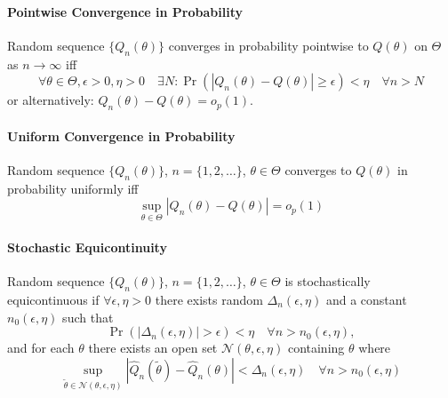 \documentclass[a4paper]{article}
\numberwithin{equation}{subsection}
\begin{document}
\paragraph{Pointwise Convergence in Probability}

Random sequence $\{Q_{n}(\theta)\}$ converges in probability pointwise
to $Q(\theta)$ on $\Theta$ as $n\to\infty$
iff
\begin{equation}
  \label{eq:convergence_in_probability}
  \forall \theta\in\Theta, \epsilon>0, \eta > 0
  \quad
  \exists N:
  \Pr( | Q_{n}(\theta) - Q(\theta)| \ge \epsilon) < \eta
  \quad \forall n > N
\end{equation}
or alternatively: $Q_{n}(\theta) - Q(\theta) = o_{p}(1)$. 


\paragraph{Uniform Convergence in Probability}

Random sequence $\{Q_{n}(\theta)\}$, $n = \{1,2,\dots\}$, $\theta\in\Theta$ converges to
$Q(\theta)$ in probability uniformly iff
\begin{equation}
  \label{eq:uniform_convergence_in_probability}
  \sup_{\theta\in\Theta}
  \left| Q_{n}(\theta) - Q(\theta) \right| = o_{p}(1)
\end{equation}

\paragraph{Stochastic Equicontinuity}

Random sequence $\{Q_{n}(\theta)\}$, $n = \{1,2,\dots\}$,
$\theta\in\Theta$ is stochastically equicontinuous if $\forall
\epsilon, \eta > 0$ there exists random $\Delta_{n}(\epsilon, \eta)$
and a constant $n_{0}(\epsilon,\eta)$ such that 
\begin{equation}
  \Pr(|\Delta_{n}(\epsilon,\eta)| > \epsilon) < \eta
  \quad \forall n > n_{0}(\epsilon,\eta),
\end{equation}
and for each $\theta$ there exists an open set $\mathscr{N}(\theta,
\epsilon, \eta)$ containing $\theta$ where
\begin{equation}
  \label{eq:stochastic_equicontinuity}
  \sup_{\tilde\theta \in \mathscr{N}(\theta,\epsilon,\eta)}
  \left|
    \hat Q_{n}(\tilde \theta)
    -
    \hat Q_{n}(\theta)
  \right|
  < \Delta_{n}(\epsilon,\eta)
  \quad
  \forall n > n_{0}(\epsilon,\eta)
\end{equation}
\end{document}
